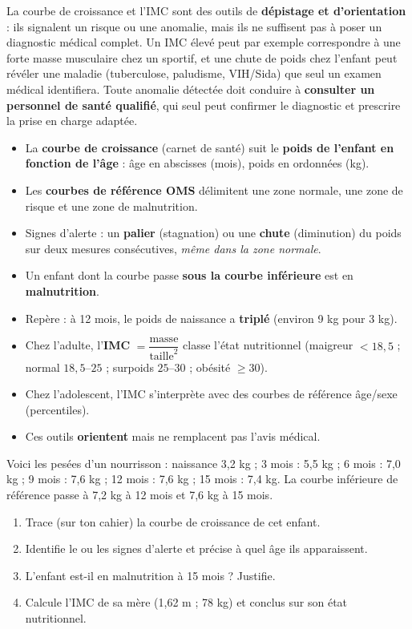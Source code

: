 \documentclass[11pt]{article}
\begin{document}
\begin{attention}
La courbe de croissance et l'IMC sont des outils de \textbf{dépistage et d'orientation} : ils signalent un risque ou une anomalie, mais ils ne suffisent pas à poser un diagnostic médical complet. Un IMC élevé peut par exemple correspondre à une forte masse musculaire chez un sportif, et une chute de poids chez l'enfant peut révéler une maladie (tuberculose, paludisme, VIH/Sida) que seul un examen médical identifiera. Toute anomalie détectée doit conduire à \textbf{consulter un personnel de santé qualifié}, qui seul peut confirmer le diagnostic et prescrire la prise en charge adaptée.
\end{attention}

\begin{aretenir}
\begin{itemize}
\item La \textbf{courbe de croissance} (carnet de santé) suit le \textbf{poids de l'enfant en fonction de l'âge} : âge en abscisses (mois), poids en ordonnées (kg).
\item Les \textbf{courbes de référence OMS} délimitent une zone normale, une zone de risque et une zone de malnutrition.
\item Signes d'alerte : un \textbf{palier} (stagnation) ou une \textbf{chute} (diminution) du poids sur deux mesures consécutives, \emph{même dans la zone normale}.
\item Un enfant dont la courbe passe \textbf{sous la courbe inférieure} est en \textbf{malnutrition}.
\item Repère : à 12 mois, le poids de naissance a \textbf{triplé} (environ 9 kg pour 3 kg).
\item Chez l'adulte, l'\textbf{IMC} $= \dfrac{\text{masse}}{\text{taille}^2}$ classe l'état nutritionnel (maigreur $< 18{,}5$ ; normal $18{,}5$--$25$ ; surpoids $25$--$30$ ; obésité $\geq 30$).
\item Chez l'adolescent, l'IMC s'interprète avec des courbes de référence âge/sexe (percentiles).
\item Ces outils \textbf{orientent} mais ne remplacent pas l'avis médical.
\end{itemize}
\end{aretenir}

\begin{exercice}
Voici les pesées d'un nourrisson : naissance 3,2 kg ; 3 mois : 5,5 kg ; 6 mois : 7,0 kg ; 9 mois : 7,6 kg ; 12 mois : 7,6 kg ; 15 mois : 7,4 kg. La courbe inférieure de référence passe à 7,2 kg à 12 mois et 7,6 kg à 15 mois.
\begin{enumerate}
\item Trace (sur ton cahier) la courbe de croissance de cet enfant.
\item Identifie le ou les signes d'alerte et précise à quel âge ils apparaissent.
\item L'enfant est-il en malnutrition à 15 mois ? Justifie.
\item Calcule l'IMC de sa mère (1,62 m ; 78 kg) et conclus sur son état nutritionnel.
\end{enumerate}
\end{exercice}
\end{document}
